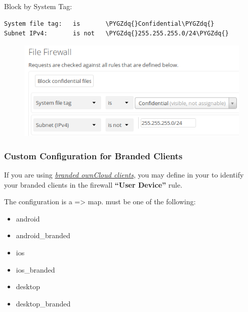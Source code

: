 \documentclass[letterpaper,10pt,english]{sphinxmanual}
\def\PYGZdq{\char`\"}
\begin{document}
Block by System Tag:

\begin{Verbatim}[commandchars=\\\{\}]
System file tag:   is       \PYGZdq{}Confidential\PYGZdq{}
Subnet IPv4:       is not   \PYGZdq{}255.255.255.0/24\PYGZdq{}
\end{Verbatim}
\begin{figure}[htbp]
\centering

\includegraphics{firewall-3.png}
\end{figure}


\subsubsection{Custom Configuration for Branded Clients}
\label{enterprise_firewall/file_firewall:custom-configuration-for-branded-clients}
If you are using {\hyperref[enterprise_clients/index::doc]{\emph{branded ownCloud clients}}},
you may define  in your  to identify
your branded clients in the firewall \textbf{``User Device''} rule.

The configuration is a  =\textgreater{}  map.  must be one
of the following:
\begin{itemize}
\item {} 
android

\item {} 
android\_branded

\item {} 
ios

\item {} 
ios\_branded

\item {} 
desktop

\item {} 
desktop\_branded

\end{itemize}
\end{document}
